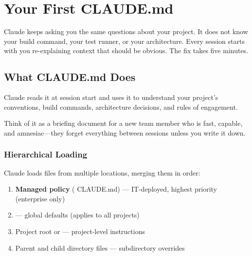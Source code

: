 \chapter{Your First CLAUDE.md}
\label{ch:first-claude-md}

\begin{itshape}
Claude keeps asking you the same questions about your project.
It does not know your build command, your test runner, or your architecture.
Every session starts with you re-explaining context that should be obvious.
The fix takes five minutes.
\end{itshape}

\section{What CLAUDE.md Does}
\label{sec:what-claude-md}


Claude reads it at session start and uses it to understand your project's conventions,
build commands, architecture decisions, and rules of engagement.

Think of it as a briefing document for a new team member who is fast,
capable, and amnesiac---they forget everything between sessions
unless you write it down.

\subsection{Hierarchical Loading}

Claude loads  files from multiple locations, merging them in order:

\begin{enumerate}
  \item \textbf{Managed policy} ( CLAUDE.md) --- IT-deployed,
    highest priority (enterprise only)
  \item {} --- global defaults (applies to all projects)
  \item Project root  or  --- project-level instructions
  \item Parent and child directory  files --- subdirectory overrides
\end{enumerate}

